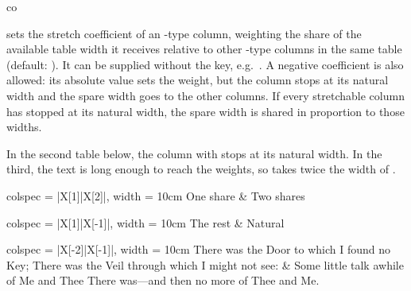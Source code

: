 \begin{codedescribe}[
    key,
    new=2021B
  ]{co}
  \begin{codesyntax}
  \end{codesyntax}
   sets the stretch coefficient of an -type column, weighting the share of the available table width it receives relative to other -type columns in the same table (default: ). It can be supplied without the key, e.g.\ . A negative coefficient is also allowed: its absolute value sets the weight, but the column stops at its natural width and the spare width goes to the other columns. If every stretchable column has stopped at its natural width, the spare width is shared in proportion to those widths.

  In the second table below, the column with  stops at its natural width. In the third, the text is long enough to reach the weights, so  takes twice the width of .

  \begin{codestore}[st=types:co]
    \begin{tblr}{colspec = {|X[1]|X[2]|}, width = 10cm}
      One share & Two shares
    \end{tblr}

    \begin{tblr}{colspec = {|X[1]|X[-1]|}, width = 10cm}
      The rest & Natural
    \end{tblr}

    \begin{tblr}{colspec = {|X[-2]|X[-1]|}, width = 10cm}
      There was the Door to which I found no Key;
      There was the Veil through which I might not see: &
      Some little talk awhile of Me and Thee
      There was---and then no more of Thee and Me.
    \end{tblr}\end{codestore}
  \begin{center}
  \end{center}
\end{codedescribe}

